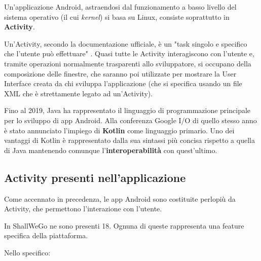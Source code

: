             Un'applicazione Android, astraendosi dal funzionamento a basso livello del sistema operativo (il cui \textit{kernel}) si basa su Linux, consiste soprattutto in \textbf{Activity}.

            Un'Activity, secondo la documentazione ufficiale, è un "task singolo e specifico che l'utente può effettuare" \cite{AndroidDoc}. Quasi tutte le Activity interagiscono con l'utente e, tramite operazioni normalmente trasparenti allo sviluppatore, si occupano della composizione delle finestre, che saranno poi utilizzate per mostrare la User Interface creata da chi sviluppa l'applicazione (che si specifica usando un file XML che è strettamente legato ad un'Activity).

            Fino al 2019, Java ha rappresentato il linguaggio di programmazione principale per lo sviluppo di app Android. Alla conferenza Google I/O di quello stesso anno è stato annunciato l'impiego di \textbf{Kotlin} come linguaggio primario. Uno dei vantaggi di Kotlin è rappresentato dalla sua sintassi più concisa rispetto a quella di Java mantenendo comunque l'\textbf{interoperabilità} con quest'ultimo.
        
        \subsection{Activity presenti nell'applicazione}
            Come accennato in precedenza, le app Android sono costituite perlopiù da Activity, che permettono l'interazione con l'utente.

            In ShallWeGo ne sono presenti 18. Ognuna di queste rappresenta una feature specifica della piattaforma.

            Nello specifico:

